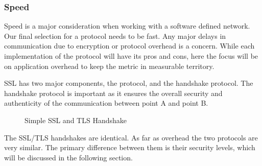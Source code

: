 \documentclass[10pt,letterpaper,onecolumn,draftclsnofoot]{IEEEtran}
\begin{document}
\subsubsection{Speed}
Speed is a major consideration when working with a software defined network.
Our final selection for a protocol needs to be fast. Any major delays in
communication due to encryption or protocol overhead is a concern. While each
implementation of the protocol will have its pros and cons, here the focus
will be on application overhead to keep the metric in measurable territory.

SSL has two major components, the protocol, and the handshake protocol. The
handshake protocol is important as it ensures the overall security and
authenticity of the communication between point A and point B.
~\cite{topdown-ssl}

\begin{figure}[H]
	\begin{center}
		\caption{Simple SSL and TLS Handshake\cite{ibm-diagram}}
	\end{center}
\end{figure}

The SSL/TLS handshakes are identical. As far as overhead the two protocols
are very similar. The primary difference between them is their security levels,
which will be discussed in the following section.
\end{document}
